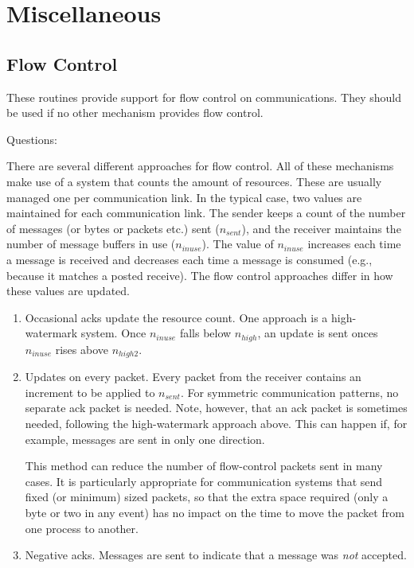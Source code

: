 \documentclass{article}
\begin{document}
%

\section{Miscellaneous}
\label{sec:misc}

\subsection{Flow Control}
\label{sec:flow-control}
These routines provide support for flow control on communications.
They should be used if no other mechanism provides flow control.

Questions:

\makeussubscript
There are several different approaches for flow control.  All of these
mechanisms make use of a system that counts the amount of resources.
These are usually managed one per communication link.  In the typical
case, two values are maintained for each communication link.  The
sender keeps a count of the number of messages (or bytes or packets
etc.) sent ($n_{sent}$), and the receiver maintains the number of
message buffers 
in use ($n_{inuse}$).  The value of $n_{inuse}$ increases each time a
message is received and decreases each time a message is consumed
(e.g., because it matches a posted receive). 
The flow control approaches differ in how these values are updated. 

\begin{enumerate}
\item Occasional acks update the resource count.  One approach is a
high-watermark system.  Once $n_{inuse}$ falls below $n_{high}$, an
update is sent onces $n_{inuse}$ rises above $n_{high2}$. 

\item Updates on every packet.  Every packet from the receiver
contains an increment to be applied to $n_{sent}$.  For symmetric
communication patterns, no separate ack packet is needed.  Note,
however, that an ack packet is sometimes needed, following the
high-watermark approach above.  This can happen if, for example,
messages are sent in only one direction.  

This method can reduce the number of flow-control packets sent in many
cases.  It is particularly appropriate for communication systems that
send fixed (or minimum) sized packets, so that the extra space
required (only a byte or two in any event) has no impact on the time
to move the packet from one process to another.  

\item Negative acks.  Messages are sent to indicate that a message was
\emph{not} accepted. 

\end{enumerate}
\makeustext
\end{document}
